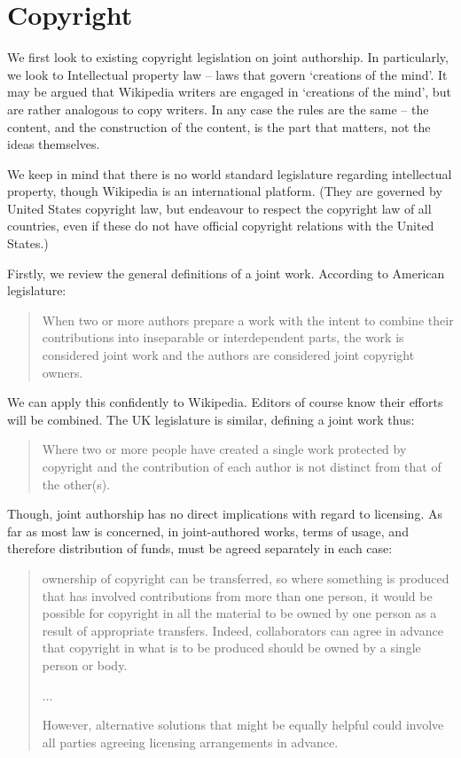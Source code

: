 \section{Copyright}
\label{sec:copyright}
We first look to existing copyright legislation on joint
authorship. In particularly, we look to Intellectual property law --
laws that govern `creations of the mind'. It may be argued that
Wikipedia writers are engaged in `creations of the mind', but are
rather analogous to copy writers. In any case the rules are the same
-- the content, and the construction of the content, is the part that
matters, not the ideas themselves.\cite{i-property}

We keep in mind that there is no world standard legislature regarding
intellectual property, though Wikipedia is an international
platform. (They are governed by United States copyright law, but
endeavour to respect the copyright law of all countries, even if these
do not have official copyright relations with the United
States.\cite{wiki-letter})

Firstly, we review the general definitions of a joint work. According
to American legislature:

\begin{quote}
  When two or more authors prepare a work with the intent to combine
  their contributions into inseparable or interdependent parts, the
  work is considered joint work and the authors are considered joint
  copyright owners.\cite{what-joint-authorship}
\end{quote}

We can apply this confidently to Wikipedia. Editors of course know
their efforts will be combined. The UK legislature is similar,
defining a joint work thus:

\begin{quote}
  Where two or more people have created a single work protected by
  copyright and the contribution of each author is not distinct from
  that of the other(s).\cite{joint-authorship}
\end{quote}

Though, joint authorship has no direct implications with regard to
licensing. As far as most law is concerned, in joint-authored works,
terms of usage, and therefore distribution of funds, must be agreed
separately in each case:

\begin{quote}
  ownership of copyright can be transferred, so where something is
  produced that has involved contributions from more than one person,
  it would be possible for copyright in all the material to be owned
  by one person as a result of appropriate transfers. Indeed,
  collaborators can agree in advance that copyright in what is to be
  produced should be owned by a single person or body. 

  ... 

  However, alternative solutions that might be equally helpful could
  involve all parties agreeing licensing arrangements in
  advance.\cite{joint-authorship}
\end{quote}

